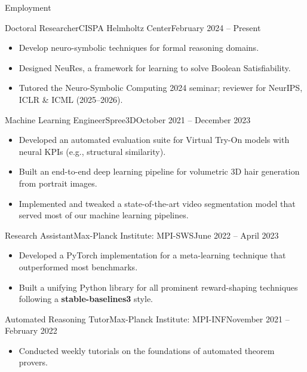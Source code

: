 \documentclass[]{mcdowellcv}
\begin{document}
	\vspace{-0.5em}
	\begin{cvsection}{Employment}

            \begin{cvsubsection}{Doctoral Researcher}{CISPA Helmholtz Center}{February 2024 -- Present}
			\begin{itemize}
                \item Develop neuro-symbolic techniques for formal reasoning domains.
                \item Designed NeuRes, a framework for learning to solve Boolean Satisfiability.
                \item Tutored the Neuro-Symbolic Computing 2024 seminar; reviewer for NeurIPS, ICLR \& ICML (2025--2026).
			\end{itemize}
		\end{cvsubsection}
        \begin{cvsubsection}{Machine Learning Engineer}{Spree3D}{October 2021 -- December 2023}
			\begin{itemize}
                \item Developed an automated evaluation suite for Virtual Try-On models with neural KPIs (e.g., structural similarity).
                \item Built an end-to-end deep learning pipeline for volumetric 3D hair generation from portrait images.
                \item Implemented and tweaked a state-of-the-art video segmentation model that served most of our machine learning pipelines.
			\end{itemize}
		\end{cvsubsection}

		\begin{cvsubsection}{Research Assistant}{Max-Planck Institute: MPI-SWS}{June 2022 -- April 2023}
			\begin{itemize}
				\item Developed a PyTorch implementation for a meta-learning technique that outperformed most benchmarks.
                \item Built a unifying Python library for all prominent reward-shaping techniques following a \textbf{stable-baselines3} style.
			\end{itemize}
		\end{cvsubsection}

		\begin{cvsubsection}{Automated Reasoning Tutor}{Max-Planck Institute: MPI-INF}{November 2021 -- February 2022}
			\begin{itemize}
				\item Conducted weekly tutorials on the foundations of automated theorem provers.
			\end{itemize}
		\end{cvsubsection}



\end{cvsection}
\end{document}
